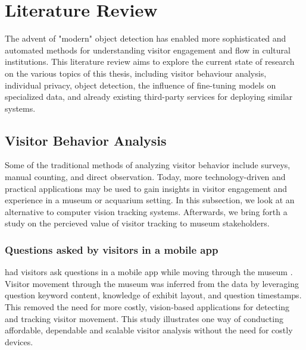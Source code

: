 \section{Literature Review}
\label{sec:literature}
The advent of "modern" object detection has enabled more sophisticated and automated methods for understanding visitor engagement and flow in cultural institutions. This literature review aims to explore the current state of research on the various topics of this thesis, including visitor behaviour analysis, individual privacy, object detection, the influence of fine-tuning models on specialized data, and already existing third-party services for deploying similar systems.

\subsection{Visitor Behavior Analysis}

Some of the traditional methods of analyzing visitor behavior include surveys, manual counting, and direct observation. Today, more technology-driven and practical applications may be used to gain insights in visitor engagement and experience in a museum or acquarium setting. In this subsection, we look at an alternative to computer vision tracking systems. Afterwards, we bring forth a study on the percieved value of visitor tracking to museum stakeholders. 

\subsubsection{Questions asked by visitors in a mobile app}
\citeauthor{co2023appquestionairre} had visitors ask questions in a mobile app while moving through the museum \citeyear{co2023appquestionairre}. Visitor movement through the museum was inferred from the data by leveraging question keyword content, knowledge of exhibit layout, and question timestamps. This removed the need for more costly, vision-based applications for detecting and tracking visitor movement. This study illustrates one way of conducting affordable, dependable and scalable visitor analysis without the need for costly devices.

